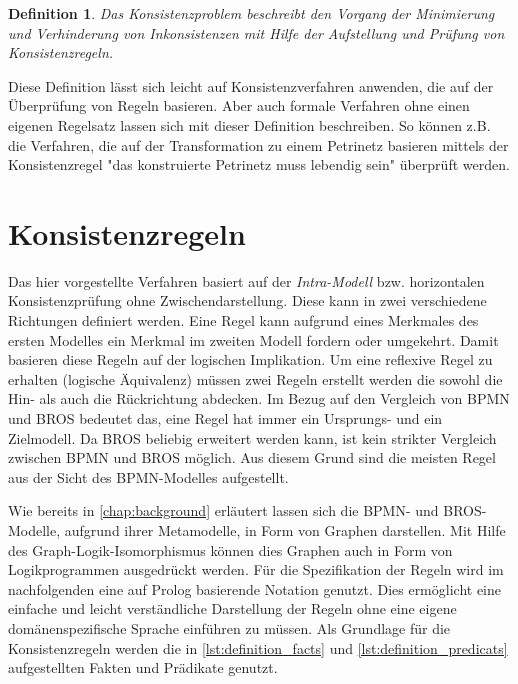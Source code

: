 \newtheorem*{konsistenzproblem}{Definition}

\begin{konsistenzproblem}
    Das Konsistenzproblem beschreibt den Vorgang der Minimierung und Verhinderung von Inkonsistenzen mit Hilfe der Aufstellung und Prüfung von Konsistenzregeln.
\end{konsistenzproblem}

Diese Definition lässt sich leicht auf Konsistenzverfahren anwenden, die auf der Überprüfung von Regeln basieren.
Aber auch formale Verfahren ohne einen eigenen Regelsatz lassen sich mit dieser Definition beschreiben.
So können z.B. die Verfahren, die auf der Transformation zu einem Petrinetz basieren mittels der Konsistenzregel "das konstruierte Petrinetz muss lebendig sein" überprüft werden.

\section{Konsistenzregeln} \label{sec:Konsistenzregeln}

Das hier vorgestellte Verfahren basiert auf der \emph{Intra-Modell} bzw. horizontalen Konsistenzprüfung ohne Zwischendarstellung.
Diese kann in zwei verschiedene Richtungen definiert werden.
Eine Regel kann aufgrund eines Merkmales des ersten Modelles ein Merkmal im zweiten Modell fordern oder umgekehrt.
Damit basieren diese Regeln auf der logischen Implikation.
Um eine reflexive Regel zu erhalten (logische Äquivalenz) müssen zwei Regeln erstellt werden die sowohl die Hin- als auch die Rückrichtung abdecken.
Im Bezug auf den Vergleich von BPMN und BROS bedeutet das, eine Regel hat immer ein Ursprungs- und ein Zielmodell.
Da BROS beliebig erweitert werden kann, ist kein strikter Vergleich zwischen BPMN und BROS möglich.
Aus diesem Grund sind die meisten Regel aus der Sicht des BPMN-Modelles aufgestellt.

Wie bereits in \cref{chap:background} erläutert lassen sich die BPMN- und BROS-Modelle, aufgrund ihrer Metamodelle, in Form von Graphen darstellen.
Mit Hilfe des Graph-Logik-Isomorphismus können dies Graphen auch in Form von Logikprogrammen ausgedrückt werden.
Für die Spezifikation der Regeln wird im nachfolgenden eine auf Prolog basierende Notation genutzt.
Dies ermöglicht eine einfache und leicht verständliche Darstellung der Regeln ohne eine eigene domänenspezifische Sprache einführen zu müssen.
Als Grundlage für die Konsistenzregeln werden die in \cref{lst:definition_facts} und \cref{lst:definition_predicats} aufgestellten Fakten und Prädikate genutzt.

